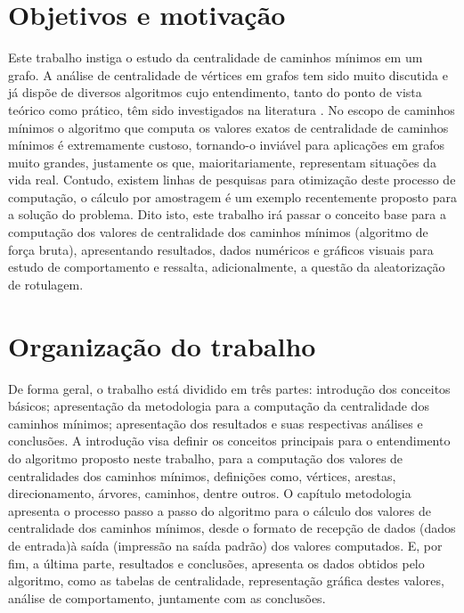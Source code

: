 \section{Objetivos e motivação}
Este trabalho instiga o estudo da centralidade de caminhos mínimos em um grafo. A análise de centralidade de vértices em grafos tem sido muito discutida e já dispõe de diversos algoritmos cujo entendimento, tanto do ponto de vista teórico como prático, têm sido investigados na literatura \cite{williams2014} \cite{pettie2002}. No escopo de caminhos mínimos o algoritmo que computa os valores exatos de centralidade de caminhos mínimos é extremamente custoso, tornando-o inviável para aplicações em grafos muito grandes, justamente os que, maioritariamente, representam situações da vida real. Contudo, existem linhas de pesquisas para otimização deste processo de computação, o cálculo por amostragem \cite{alane2021} é um exemplo recentemente proposto para a solução do problema. Dito isto, este trabalho irá passar o conceito base para a computação dos valores de centralidade dos caminhos mínimos (algoritmo de força bruta), apresentando resultados, dados numéricos e gráficos visuais para estudo de comportamento e ressalta, adicionalmente, a questão da aleatorização de rotulagem.

\section{Organização do trabalho}
De forma geral, o trabalho está dividido em três partes: introdução dos conceitos básicos; apresentação da metodologia para a computação da centralidade dos caminhos mínimos; apresentação dos resultados e suas respectivas análises e conclusões. A introdução visa definir os conceitos principais para o entendimento do algoritmo proposto neste trabalho, para a computação dos valores de centralidades dos caminhos mínimos, definições como, vértices, arestas, direcionamento, árvores, caminhos, dentre outros. O capítulo metodologia apresenta o processo passo a passo do algoritmo para o cálculo dos valores de centralidade dos caminhos mínimos, desde o formato de recepção de dados (dados de entrada)à saída (impressão na saída padrão) dos valores computados. E, por fim, a última parte, resultados e conclusões, apresenta os dados obtidos pelo algoritmo, como as tabelas de centralidade, representação gráfica destes valores, análise de comportamento, juntamente com as conclusões.